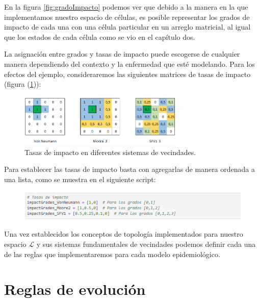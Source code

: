 \begin{example}
En la figura \ref{fig:gradoImpacto} podemos ver que debido a la manera en la que implementamos nuestro espacio de células, es posible representar los grados de impacto de cada una con una célula particular en un arreglo matricial, al igual que los estados de cada célula como se vio en el capítulo dos.

La asignación entre grados y tasas de impacto puede escogerse de cualquier manera dependiendo del contexto y la enfermedad que esté modelando. Para los efectos del ejemplo, consideraremos las siguientes matrices de tasas de impacto (figura (\ref{fig:tasaImpacto})):

\begin{figure}[h]
  \centering
    \includegraphics[width=0.7\textwidth]{Imagenes/ex3152.PNG}
  \caption{Tasas de impacto en diferentes sistemas de vecindades.}
  \label{fig:tasaImpacto}
\end{figure}
\end{example}

\newpage

Para establecer las tasas de impacto basta con agregarlas de manera ordenada a una lista, como se muestra en el siguiente script:

\begin{figure}[h]
  \centering
    \includegraphics[width=1\textwidth]{Imagenes/interaccionesSociales3.png}
\end{figure}

Una vez establecidos los conceptos de topología implementados para nuestro espacio $\mathcal{L}$ y sus sistemas fundamentales de vecindades podemos definir cada una de las reglas que implementaremos para cada modelo epidemiológico.

\section{Reglas de evolución}\label{sec:ReglasDeEvolución}

